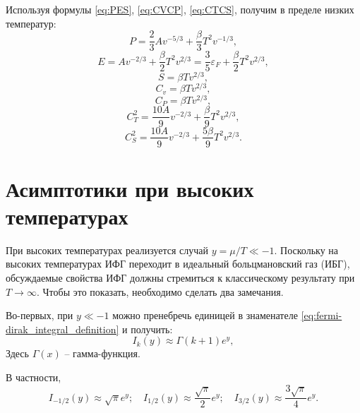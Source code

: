 Используя формулы \eqref{eq:PES}, \eqref{eq:CVCP}, \eqref{eq:CTCS}, получим в пределе низких температур:
\begin{equation}
    \label{eq:P_lt}
    P = \frac{2}{3}Av^{-5/3} + \frac{\beta}{3}T^2 v^{-1/3},
\end{equation}
\begin{equation}
    \label{eq:E_lt}
    E = Av^{-2/3} + \frac{\beta}{2}T^2 v^{2/3} = \frac{3}{5}\varepsilon_F + \frac{\beta}{2}T^2 v^{2/3},
\end{equation}
\begin{equation}
    \label{eq:S_lt}
    S = \beta T v^{2/3},
\end{equation}
\begin{equation}
    \label{eq:cv_lt}
    C_v = \beta T v^{2/3},
\end{equation}
\begin{equation}
    \label{eq:cp_lt}
    C_P = \beta T v^{2/3},
\end{equation}
\begin{equation}
    \label{eq:ct2_lt}
    C_T^2 = \frac{10A}{9}v^{-2/3} + \frac{\beta}{9}T^2 v^{2/3},
\end{equation}
\begin{equation}
    \label{eq:cs2_lt}
    C_S^2 = \frac{10A}{9}v^{-2/3} + \frac{5\beta}{9}T^2 v^{2/3}.
\end{equation}

\section{Асимптотики при высоких температурах}
\label{sec:asymp_high}
При высоких температурах реализуется случай $y = \mu / T \ll -1$.
Поскольку на высоких температурах ИФГ переходит в идеальный больцмановский газ (ИБГ), обсуждаемые свойства ИФГ должны стремиться к классическому результату при $T \to \infty$.
Чтобы это показать, необходимо сделать два замечания.

Во-первых, при $y \ll -1$ можно пренебречь единицей в знаменателе \eqref{eq:fermi-dirak_integral_definition} и получить:
\begin{equation}
    \label{eq:ifg_hightemp}
    I_{k}(y)\approx \Gamma(k + 1)e^{y},
\end{equation}
Здесь $\Gamma(x)$ -- гамма-функция.

В частности,
\begin{equation*}
    I_{-1/2}(y)\approx \sqrt{\pi}e^{y};\quad I_{1/2}(y)\approx \frac{\sqrt{\pi}}{2}e^{y};\quad
    I_{3/2}(y)\approx \frac{3\sqrt{\pi}}{4}e^{y}.
\end{equation*}


